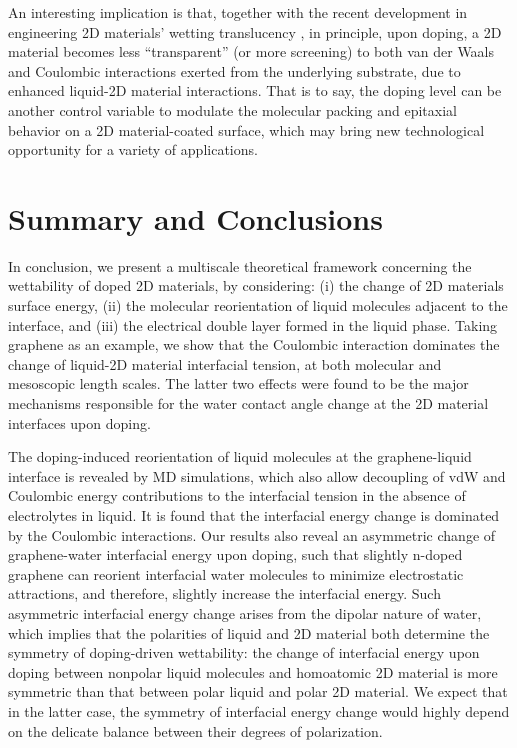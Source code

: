 An interesting implication is that, together with the recent
development in engineering 2D materials’ wetting translucency
\cite{raj_wettability_2013,rafiee_wetting_2012,shih_breakdown_2012,shih_wetting_2013},
in principle, upon doping, a 2D material becomes less “transparent” (or more screening)
to both van der Waals and Coulombic interactions exerted from the underlying
substrate, due to enhanced liquid-2D material interactions. That is to say, the doping level can be
another control variable to modulate the molecular packing and
epitaxial behavior on a 2D material-coated surface, which may bring
new technological opportunity for a variety of applications.


\section{Summary and Conclusions}
\label{sec:org0fb53ec}

In conclusion, we present a multiscale theoretical framework
concerning the wettability of doped 2D materials, by considering: (i)
the change of 2D materials surface energy, (ii) the molecular
reorientation of liquid molecules adjacent to the interface, and (iii)
the electrical double layer formed in the liquid phase. Taking
graphene as an example, we show that the Coulombic interaction
dominates the change of liquid-2D material interfacial tension, at
both molecular and mesoscopic length scales. The latter two effects were
found to be the major mechanisms responsible for the water contact angle
change at the 2D material interfaces upon doping.

The doping-induced reorientation of liquid molecules at the
graphene-liquid interface is revealed by MD simulations, which also
allow decoupling of vdW and Coulombic energy contributions to the
interfacial tension in the absence of electrolytes in liquid. It is
found that the interfacial energy change is dominated by the Coulombic
interactions. Our results also reveal an asymmetric change of
graphene-water interfacial energy upon doping, such that slightly
n-doped graphene can reorient interfacial water molecules to minimize
electrostatic attractions, and therefore, slightly increase the
interfacial energy. Such asymmetric interfacial energy change arises
from the dipolar nature of water, which implies that the polarities of
liquid and 2D material both determine the symmetry of
doping-driven wettability: the change of interfacial energy upon
doping between nonpolar liquid molecules and homoatomic 2D material is
more symmetric than that between polar liquid and polar 2D
material. We expect that in the latter case, the symmetry of
interfacial energy change would highly depend on the delicate balance
between their degrees of polarization.

